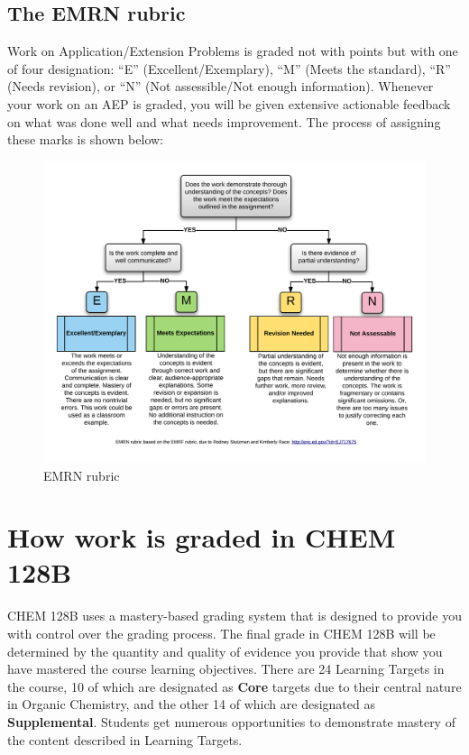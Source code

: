 \hypertarget{the-emrn-rubric}{%
\subsection{The EMRN rubric}\label{the-emrn-rubric}}

Work on Application/Extension Problems is graded not with points but
with one of four designation: ``E'' (Excellent/Exemplary), ``M'' (Meets
the standard), ``R'' (Needs revision), or ``N'' (Not assessible/Not
enough information). Whenever your work on an AEP is graded, you will be
given extensive actionable feedback on what was done well and what needs
improvement. The process of assigning these marks is shown below:

\begin{figure}
\centering
\includegraphics{emrn.png}
\caption{EMRN rubric}
\end{figure}

\hypertarget{grading}{%
\section{How work is graded in CHEM 128B}\label{grading}}

CHEM 128B uses a mastery-based grading system that is designed to
provide you with control over the grading process. The final grade in
CHEM 128B will be determined by the quantity and quality of evidence you
provide that show you have mastered the course learning objectives.
There are 24 Learning Targets in the course, 10 of which are designated
as \textbf{Core} targets due to their central nature in Organic
Chemistry, and the other 14 of which are designated as
\textbf{Supplemental}. Students get numerous opportunities to
demonstrate mastery of the content described in Learning Targets.

